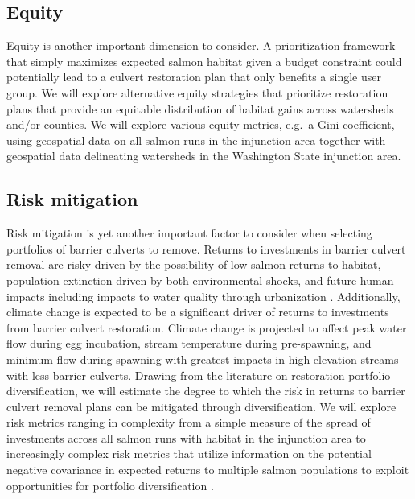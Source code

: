 \documentclass[12pt]{elsarticle}
\begin{document}
\subsection{Equity}

Equity is another important dimension to consider. A prioritization framework that simply maximizes expected salmon habitat given a budget constraint could potentially lead to a culvert restoration plan that only benefits a single user group. We will explore alternative equity strategies that prioritize restoration plans that provide an equitable distribution of habitat gains across watersheds and/or counties. We will explore various equity metrics, e.g.\ a Gini coefficient, using geospatial data on all salmon runs in the injunction area together with geospatial data delineating watersheds in the Washington State injunction area. 

\subsection{Risk mitigation}

Risk mitigation is yet another important factor to consider when selecting portfolios of barrier culverts to remove. Returns to investments in barrier culvert removal are risky driven by the possibility of low salmon returns to habitat, population extinction driven by both environmental shocks, and future human impacts including impacts to water quality through urbanization \citep{ettinger2021prioritizing}. Additionally, climate change is expected to be a significant driver of returns to investments from barrier culvert restoration. Climate change is projected to affect peak water flow during egg incubation, stream temperature during pre-spawning, and minimum flow during spawning \citet{battin2007projected} with greatest impacts in high-elevation streams with less barrier culverts. Drawing from the literature on restoration portfolio diversification, we will estimate the degree to which the risk in returns to barrier culvert removal plans can be mitigated through diversification. We will explore risk metrics ranging in complexity from a simple measure of the spread of investments across all salmon runs with habitat in the injunction area to increasingly complex risk metrics that utilize information on the potential negative covariance in expected returns to multiple salmon populations to exploit opportunities for portfolio diversification \citep{sanchirico2008empirical, jardine2015fishermen, johnston2002combining}.  
\end{document}
